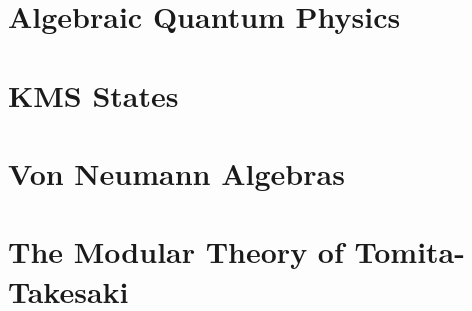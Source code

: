 \documentclass{beamer}
\theoremstyle{definition}
\begin{document}
\section{Algebraic Quantum Physics}

\section{KMS States}

\section{Von Neumann Algebras}

\section{The Modular Theory of Tomita-Takesaki}
\end{document}
